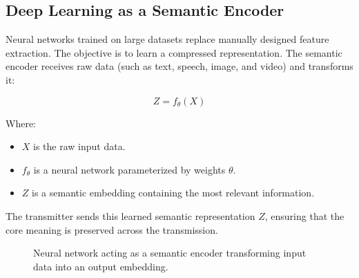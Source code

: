 \documentclass[10pt, conference]{IEEEtran}
\begin{document}
\subsection{\textbf{Deep Learning as a Semantic Encoder}}
Neural networks trained on large datasets replace manually designed feature extraction. The objective is to learn a compressed representation. The semantic encoder receives raw data (such as text, speech, image, and video) and transforms it:

\begin{equation}
    Z = f_\theta(X)
\end{equation}

Where:
\begin{itemize}
    \item $X$ is the raw input data.
    \item $f_\theta$ is a neural network parameterized by weights $\theta$.
    \item $Z$ is a semantic embedding containing the most relevant information.
\end{itemize}

The transmitter sends this learned semantic representation $Z$, ensuring that the core meaning is preserved across the transmission.

\begin{figure}[h]
\centering
{}
\caption{Neural network acting as a semantic encoder transforming input data into an output embedding.}
\label{fig:nn_encoder}
\end{figure}
\end{document}
